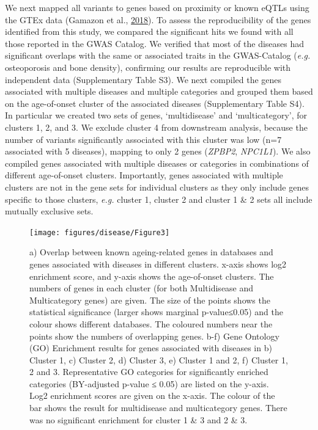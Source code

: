 \documentclass[12pt,twoside]{unicam}
\begin{document}
We next mapped all variants to genes based on proximity or known eQTLs using the GTEx data (Gamazon et al., \protect\hyperlink{ref-Gamazon2018}{2018}). To assess the reproducibility of the genes identified from this study, we compared the significant hits we found with all those reported in the GWAS Catalog. We verified that most of the diseases had significant overlaps with the same or associated traits in the GWAS-Catalog (\emph{e.g.} osteoporosis and bone density), confirming our results are reproducible with independent data (Supplementary Table S3). We next compiled the genes associated with multiple diseases and multiple categories and grouped them based on the age-of-onset cluster of the associated diseases (Supplementary Table S4). In particular we created two sets of genes, `multidisease' and `multicategory', for clusters 1, 2, and 3. We exclude cluster 4 from downstream analysis, because the number of variants significantly associated with this cluster was low (n=7 associated with 5 diseases), mapping to only 2 genes (\emph{ZPBP2}, \emph{NPC1L1}). We also compiled genes associated with multiple diseases or categories in combinations of different age-of-onset clusters. Importantly, genes associated with multiple clusters are not in the gene sets for individual clusters as they only include genes specific to those clusters, \emph{e.g.} cluster 1, cluster 2 and cluster 1 \& 2 sets all include mutually exclusive sets.

\begin{figure}

{\centering \texttt{[image: figures/disease/Figure3]} 

}

\caption[Enrichment analyses for the genes associated with different age-of-onset clusters and ageing-related genes or gene ontology categories.]{a) Overlap between known ageing-related genes in databases and genes associated with diseases in different clusters. x-axis shows log2 enrichment score, and y-axis shows the age-of-onset clusters. The numbers of genes in each cluster (for both Multidisease and Multicategory genes) are given. The size of the points shows the statistical significance (larger shows marginal p-value≤0.05) and the colour shows different databases. The coloured numbers near the points show the numbers of overlapping genes. b-f) Gene Ontology (GO) Enrichment results for genes associated with diseases in b) Cluster 1, c) Cluster 2, d) Cluster 3, e) Cluster 1 and 2, f) Cluster 1, 2 and 3. Representative GO categories for significantly enriched categories (BY-adjusted p-value ≤ 0.05) are listed on the y-axis. Log2 enrichment scores are given on the x-axis. The colour of the bar shows the result for multidisease and multicategory genes. There was no significant enrichment for cluster 1 \& 3 and 2 \& 3.}\label{fig:disFig3}
\end{figure}
\end{document}
